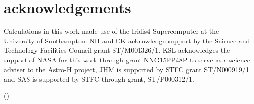 \documentclass[a4paper,fleqn,usenatbib]{mnras}
\begin{document}
\section{acknowledgements}
Calculations in this work made use of the Iridis4 Supercomputer at the University of Southampton.
NH and CK  acknowledge support by the Science and Technology Facilities Council grant ST/M001326/1. 
KSL acknowledges the support of NASA for this work through grant NNG15PP48P to serve as a 
science adviser to the Astro-H project, JHM is supported by STFC grant ST/N000919/1 and SAS 
is supported by STFC through grant, ST/P000312/1. 




()
\label{lastpage}

\bsp	%
\end{document}
